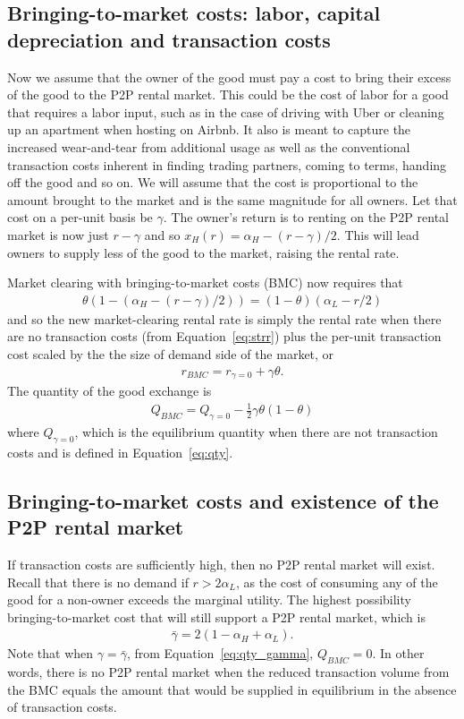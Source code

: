 \documentclass[11pt]{article}
\begin{document}
\subsection{Bringing-to-market costs: labor, capital depreciation and transaction costs}

Now we assume that the owner of the good must pay a cost to bring their excess of the good to the P2P rental market. 
This could be the cost of labor for a good that requires a labor input, such as in the case of driving with Uber or cleaning up an apartment when hosting on Airbnb.
It also is meant to capture the increased wear-and-tear from additional usage as well as the conventional transaction costs inherent in finding trading partners, coming to terms, handing off the good and so on.  
We will assume that the cost is proportional to the amount brought to the market and is the same magnitude for all owners.
Let that cost on a per-unit basis be $\gamma$. 
The owner's return is to renting on the P2P rental market is now just $r - \gamma$ and so $x_H(r) = \alpha_H - (r - \gamma)/2$.
This will lead owners to supply less of the good to the market, raising the rental rate.

Market clearing with bringing-to-market costs (BMC) now requires that 
\begin{align}
  \theta (1 - (\alpha_H - (r-\gamma)/2)) = (1-\theta)(\alpha_L - r/2)
\end{align}
and so the new market-clearing rental rate is simply the rental rate when there are no transaction costs (from Equation~\ref{eq:strr}) plus the per-unit transaction cost scaled by the the size of demand side of the market, or  
\begin{align}
  r_{BMC} = r_{\gamma = 0} + \gamma \theta. 
\end{align} 
The quantity of the good exchange is
\begin{align} \label{eq:qty_gamma}
  Q_{BMC} = Q_{\gamma = 0} - \frac{1}{2} \gamma \theta (1-\theta)
\end{align} 
where $Q_{\gamma = 0}$, which is the equilibrium quantity when there are not transaction costs and is defined in Equation~\ref{eq:qty}. 

\subsection{Bringing-to-market costs and existence of the P2P rental market}
If transaction costs are sufficiently high, then no P2P rental market will exist. 
Recall that there is no demand if $r > 2 \alpha_L$, as the cost of consuming any of the good for a non-owner exceeds the marginal utility. 
The highest possibility bringing-to-market cost that will still support a P2P rental market, which is 
\begin{align} 
  \bar{\gamma} = 2(1-\alpha_H + \alpha_L). 
\end{align}
Note that when $\gamma = \bar{\gamma}$, from Equation~\ref{eq:qty_gamma}, $Q_{BMC} = 0$.
In other words, there is no P2P rental market when the reduced transaction volume from the BMC equals the amount that would be supplied in equilibrium in the absence of transaction costs. 
\end{document}
